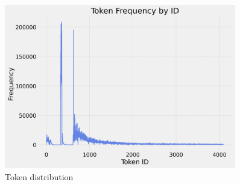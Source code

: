 \documentclass[a4paper,12pt]{extarticle}
\begin{document}
\begin{figure}[H]
    \centering
    \includegraphics[width=0.9\textwidth]{visualization_4096_REMI_train_manual_tokens_True_random_padding_True_token_frequency_by_id.png}
    \caption{Token distribution}
    \label{fig:token_distribution}
\end{figure}
\end{document}
